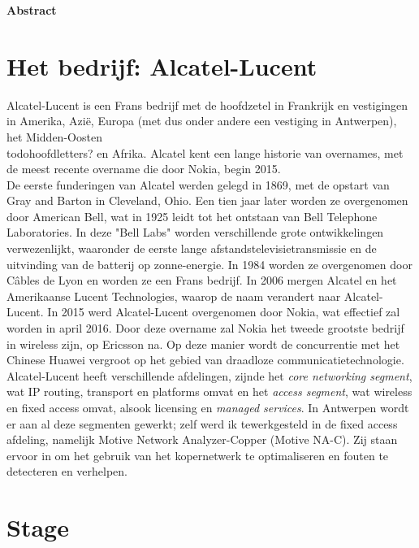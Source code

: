 \documentclass[10pt,a4paper]{article}
\begin{document}
\begin{center}
\textbf{Abstract}

\end{center}
\tableofcontents
\clearpage

\section{Het bedrijf: Alcatel-Lucent}
Alcatel-Lucent is een Frans bedrijf met de hoofdzetel in Frankrijk en vestigingen in Amerika, Azi\"e, Europa (met dus onder andere een vestiging in Antwerpen), het Midden-Oosten \\todo{hoofdletters?} en Afrika. Alcatel kent een lange historie van overnames, met de meest recente overname die door Nokia, begin 2015.\\
De eerste funderingen van Alcatel werden gelegd in 1869, met de opstart van Gray and Barton in Cleveland, Ohio. Een tien jaar later worden ze overgenomen door American Bell, wat in 1925 leidt tot het ontstaan van Bell Telephone Laboratories. In deze "Bell Labs" worden verschillende grote ontwikkelingen verwezenlijkt, waaronder de eerste lange afstandstelevisietransmissie en de uitvinding van de batterij op zonne-energie.  In 1984 worden ze overgenomen door C\^ables de Lyon en worden ze een Frans bedrijf. In 2006 mergen Alcatel en het Amerikaanse Lucent Technologies, waarop de naam verandert naar Alcatel-Lucent. In 2015 werd Alcatel-Lucent overgenomen door Nokia, wat effectief zal worden in april 2016. Door deze overname zal Nokia het tweede grootste bedrijf in wireless zijn, op Ericsson na. Op deze manier wordt de concurrentie met het Chinese Huawei vergroot op het gebied van draadloze communicatietechnologie.\\
Alcatel-Lucent heeft verschillende afdelingen, zijnde het \textit{core networking segment}, wat IP routing, transport en platforms omvat en het \textit{access segment}, wat wireless en fixed access omvat, alsook licensing en \textit{managed services}. In Antwerpen wordt er aan al deze segmenten gewerkt; zelf werd ik tewerkgesteld in de fixed access afdeling, namelijk Motive Network Analyzer-Copper (Motive NA-C). Zij staan ervoor in om het gebruik van het kopernetwerk te optimaliseren en fouten te detecteren en verhelpen.\\ 


\section{Stage}
\end{document}

